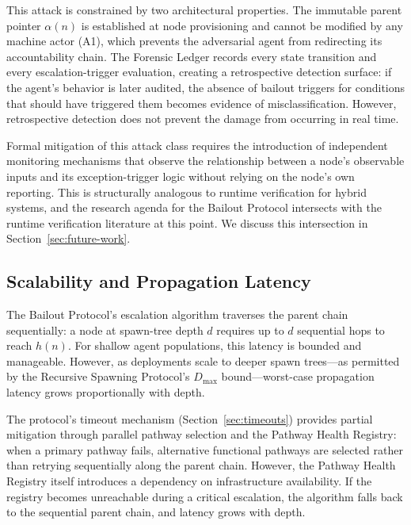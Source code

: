 This attack is constrained by two architectural properties. The immutable parent pointer $\alpha(n)$ is established at node provisioning and cannot be modified by any machine actor (A1), which prevents the adversarial agent from redirecting its accountability chain. The Forensic Ledger records every state transition and every escalation-trigger evaluation, creating a retrospective detection surface: if the agent's behavior is later audited, the absence of bailout triggers for conditions that should have triggered them becomes evidence of misclassification. However, retrospective detection does not prevent the damage from occurring in real time.

Formal mitigation of this attack class requires the introduction of independent monitoring mechanisms that observe the relationship between a node's observable inputs and its exception-trigger logic without relying on the node's own reporting. This is structurally analogous to runtime verification for hybrid systems, and the research agenda for the Bailout Protocol intersects with the runtime verification literature at this point. We discuss this intersection in Section~\ref{sec:future-work}.

\subsection{Scalability and Propagation Latency}
\label{sec:scalability}

The Bailout Protocol's escalation algorithm traverses the parent chain sequentially: a node at spawn-tree depth $d$ requires up to $d$ sequential hops to reach $h(n)$. For shallow agent populations, this latency is bounded and manageable. However, as deployments scale to deeper spawn trees---as permitted by the Recursive Spawning Protocol's $D_{\max}$ bound---worst-case propagation latency grows proportionally with depth.

The protocol's timeout mechanism (Section~\ref{sec:timeouts}) provides partial mitigation through parallel pathway selection and the Pathway Health Registry: when a primary pathway fails, alternative functional pathways are selected rather than retrying sequentially along the parent chain. However, the Pathway Health Registry itself introduces a dependency on infrastructure availability. If the registry becomes unreachable during a critical escalation, the algorithm falls back to the sequential parent chain, and latency grows with depth.

